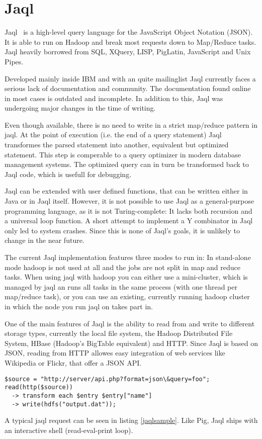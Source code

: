 \section{Jaql}

Jaql~\cite{jaqlWebsite} is a high-level query language for the JavaScript Object Notation (JSON).
It is able to run on Hadoop and break most requests down to Map/Reduce tasks.
Jaql heavily borrowed from SQL, XQuery, LISP, PigLatin, JavaScript and Unix Pipes.~\cite{jaqlOverview}

Developed mainly inside IBM and with an quite mailinglist Jaql currently faces
a serious lack of documentation and community. The documentation found online in
most cases is outdated and incomplete. In addition to this, Jaql was undergoing
major changes in the time of writing.

Even though available, there is no need to write in a strict map/reduce pattern in
jaql. At the point of execution (i.e. the end of a query statement) Jaql transformes the
parsed statement into another, equivalent but optimized statement. This step is
comperable to a query optimizer in modern database management systems. The optimized
query can in turn be transformed back to Jaql code, which is usefull for debugging.

Jaql can be extended with user defined functions, that can be written either in Java or
in Jaql itself. However, it is not possible to use Jaql as a general-purpose programming
language, as it is not Turing-complete: It lacks both recursion and a universal loop
function. A short attempt to implement a Y combinator in Jaql only led to system crashes.
Since this is none of Jaql's goals, it is unlikely to change in the near future.

The current Jaql implementation features three modes to run in: In stand-alone mode hadoop
is not used at all and the jobs are not split in map and reduce tasks. When using jaql
with hadoop you can either use a mini-cluster, which is managed by jaql an runs all tasks
in the same process (with one thread per map/reduce task), or you can use an existing,
currently running hadoop cluster in which the node you run jaql on takes part in.

One of the main features of Jaql is the ability to read from and write to different
storage types, currently the local file system, the Hadoop Distributed File System,
HBase (Hadoop's BigTable equivalent) and HTTP. Since Jaql is based on JSON, reading
from HTTP allowes easy integration of web services like Wikipedia or Flickr, that offer
a JSON API.

\begin{lstlisting}[language=jaql,caption=A sample Jaql query,float,label=jaqlsample]
$source = "http://server/api.php?format=json\&query=foo";
read(http($source)) 
  -> transform each $entry $entry["name"]
  -> write(hdfs("output.dat"));
\end{lstlisting}

A typical jaql request can be seen in listing \ref{jaqlsample}. Like Pig, Jaql ships with an
interactive shell (read-eval-print loop). 